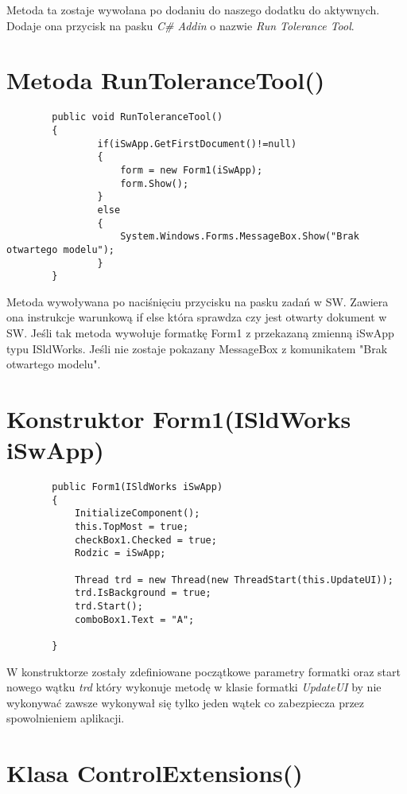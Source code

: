 \documentclass[11pt,a4paper]{article}
\begin{document}
Metoda ta zostaje wywołana po dodaniu do naszego dodatku do aktywnych. Dodaje ona przycisk na pasku \textit{C\# Addin} o nazwie \textit{Run Tolerance Tool}. 
\newline
{}
\section*{Metoda RunToleranceTool()}
\begin{lstlisting}
        public void RunToleranceTool()
        {
                if(iSwApp.GetFirstDocument()!=null)
                {
                    form = new Form1(iSwApp);
                    form.Show();
                }
                else
                {
                    System.Windows.Forms.MessageBox.Show("Brak otwartego modelu");
                }
        }
\end{lstlisting}
Metoda wywoływana po naciśnięciu przycisku na pasku zadań w SW. Zawiera ona instrukcje warunkową if else która sprawdza czy jest otwarty dokument w SW. Jeśli tak metoda wywołuje formatkę Form1 z przekazaną zmienną iSwApp typu ISldWorks.
Jeśli nie zostaje pokazany MessageBox z komunikatem "Brak otwartego modelu".
\newline
{}
\section*{Konstruktor Form1(ISldWorks iSwApp)}
\begin{lstlisting}
        public Form1(ISldWorks iSwApp)
        {
            InitializeComponent();
            this.TopMost = true;
            checkBox1.Checked = true;
            Rodzic = iSwApp;

            Thread trd = new Thread(new ThreadStart(this.UpdateUI));
            trd.IsBackground = true;
            trd.Start();
            comboBox1.Text = "A";

        }
\end{lstlisting}
W konstruktorze zostały zdefiniowane początkowe parametry formatki oraz start nowego wątku \emph{trd} który wykonuje metodę w klasie formatki \emph{UpdateUI} by nie wykonywać zawsze wykonywał się tylko jeden wątek co zabezpiecza przez spowolnieniem aplikacji.
\newpage
{}
\section*{Klasa ControlExtensions()}
\end{document}
